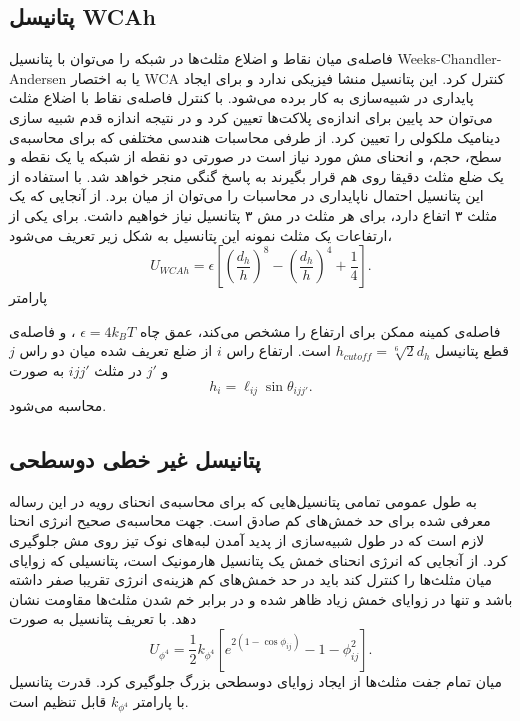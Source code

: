 \subsection{
پتانیسل
WCAh
}

فاصله‌ی میان نقاط و اضلاع مثلث‌ها در شبکه را می‌توان با پتانسیل 
Weeks-Chandler-Andersen
یا به اختصار
WCA
کنترل کرد. این پتانسیل منشا فیزیکی ندارد و برای ایجاد پایداری در شبیه‌سازی به کار برده می‌شود. با کنترل فاصله‌ی نقاط با اضلاع مثلث‌ می‌توان حد پایین برای اندازه‌ی پلاکت‌ها تعیین کرد و در نتیجه اندازه قدم شبیه‌ سازی دینامیک ملکولی را تعیین کرد. از طرفی محاسبات هندسی مختلفی که برای محاسبه‌ی سطح، حجم، و انحنای مش مورد نیاز است در صورتی دو نقطه از شبکه یا یک نقطه و یک ضلع مثلث دقیقا روی هم قرار بگیرند به پاسخ گنگی منجر خواهد شد. با استفاده از این پتانسیل احتمال ناپایداری در محاسبات را می‌توان از میان برد. از آنجایی که یک مثلث ۳ اتفاع دارد، برای هر مثلث در مش ۳ پتانسیل نیاز خواهیم داشت. برای یکی از ارتفاعات یک مثلث نمونه این پتانسیل به شکل زیر تعریف می‌شود،
\begin{equation}
U_{WCAh}=\epsilon\left[\left(\frac{d_h}{h}\right)^8-\left(\frac{d_h}{h}\right)^4+\frac{1}{4}\right].
\label{eq:wcah}
\end{equation} 
پارامتر

فاصله‌ی کمینه ممکن برای ارتفاع را مشخص می‌کند،  عمق چاه
$\epsilon=4k_BT$
، و فاصله‌ی قطع 
پتانیسل 
$h_{cutoff}=\sqrt[6]{2}d_h$
است. ارتفاع راس
$i$
از ضلع تعریف شده میان دو راس
$j$
و
$j'$
در مثلث
$ijj'$
به صورت 
\begin{equation}
h_i=\ell_{ij}\sin\theta_{ijj'}.
\end{equation} 
محاسبه می‌شود.

\subsection{
پتانیسل غیر خطی دوسطحی
}
به طول عمومی تمامی پتانسیل‌هایی که برای محاسبه‌ی انحنای رویه در این رساله معرفی شده برای حد خمش‌های کم صادق است. جهت محاسبه‌ی صحیح انرژی انحنا لازم است که در طول شبیه‌سازی از پدید آمدن لبه‌های نوک تیز روی مش جلوگیری کرد. از آنجایی که انرژی انحنای خمش یک پتانسیل هارمونیک است، پتانسیلی که زوایای میان مثلث‌ها را کنترل کند باید در حد خمش‌های کم هزینه‌ی انرژی تقریبا صفر داشته باشد و تنها در زوایای خمش زیاد ظاهر شده و در برابر خم شدن مثلث‌ها مقاومت نشان دهد. با تعریف پتانسیل به صورت
\begin{equation}
U_{\phi^4}=\frac{1}{2}k_{\phi^4}\left[e^{2(1-\cos\phi_{ij})}-1-\phi_{ij}^2 \right].
\label{eq:theta4}
\end{equation}
میان تمام جفت مثلث‌ها از ایجاد زوایای دوسطحی بزرگ جلوگیری کرد. قدرت پتانسیل با پارامتر 
$k_{\phi^4}$
قابل تنظیم است.










